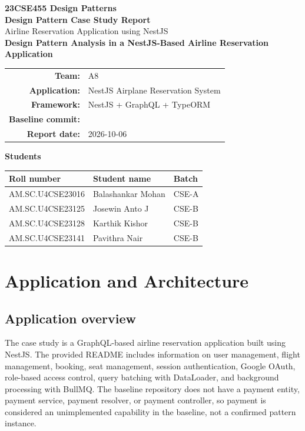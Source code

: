 \documentclass[11pt,a4paper]{article}
\newcommand{\code}[1]{\texttt{\small\detokenize{#1}}}
\begin{document}
\begin{titlepage}
\centering
\vspace*{18mm}
{\Large\textbf{23CSE455 Design Patterns}}\\[8mm]
{\LARGE\textbf{Design Pattern Case Study Report}}\\[5mm]
{\Large Airline Reservation Application using NestJS}\\[12mm]
{\large\textbf{Design Pattern Analysis in a NestJS-Based Airline Reservation Application}}\\[18mm]
\begin{tabular}{rl}
\textbf{Team:} & A8\\
\textbf{Application:} & NestJS Airplane Reservation System\\
\textbf{Framework:} & NestJS + GraphQL + TypeORM\\
\textbf{Baseline commit:} & \code{ae2c24869377ce2f7a29022cd237d808338156ea}\\
\textbf{Report date:} & 2026-10-06\\
\end{tabular}
\vfill
\textbf{Students}\\[4mm]
\begin{tabular}{lll}
\toprule
Roll number & Student name & Batch\\
\midrule
AM.SC.U4CSE23016 & Balashankar Mohan & CSE-A\\
AM.SC.U4CSE23125 & Josewin Anto J & CSE-B\\
AM.SC.U4CSE23128 & Karthik Kishor & CSE-B\\
AM.SC.U4CSE23141 & Pavithra Nair & CSE-B\\
\bottomrule
\end{tabular}
\vfill

\end{titlepage}


\newpage

\section{Application and Architecture}

\subsection{Application overview}
The case study is a GraphQL-based airline reservation application built using NestJS. The provided README includes information on user management, flight management, booking, seat management, session authentication, Google OAuth, role-based access control, query batching with DataLoader, and background processing with BullMQ. The baseline repository does not have a payment entity, payment service, payment resolver, or payment controller, so payment is considered an unimplemented capability in the baseline, not a confirmed pattern instance.
\end{document}
